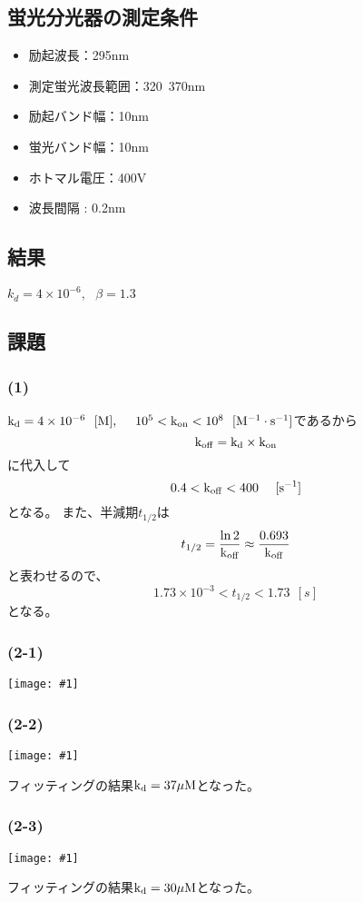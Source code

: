 \documentclass[a4paper,papersize,dvipdfmx]{jsarticle}
\newcommand{\pict}[2]{\begin{center} \texttt{[image: \#1]} \end{center}}   %
\begin{document}
\subsection*{蛍光分光器の測定条件}
\begin{itemize}
\item 励起波長：295nm
\item 測定蛍光波長範囲：320~370nm
\item 励起バンド幅：10nm
\item 蛍光バンド幅：10nm
\item ホトマル電圧：400V
\item 波長間隔 : 0.2nm

\end{itemize}
\subsection*{結果}

$k_d = 4\times 10 ^{-6}, \ \ \ \beta = 1.3$

\subsection*{課題}

\subsubsection*{(1)}
$\rm k_d = 4\times 10 ^{-6} \ \  [M], \ \ \ \ 10^5 < k_{on} < 10^8 \ \  [M^{-1} \cdot s^{-1}]$であるから
\[\rm k_{off} = k_d \times k_{on}\]
に代入して
\[\rm 0.4 < k_{off} < 400  \ \ \ \ [s^{-1}]\]
となる。
また、半減期$t_{1/2}$は
\[t_{1/2} = \frac{\ln 2}{\rm{k_{off}}} \approx \frac{0.693}{\rm{k_{off}}}\]
と表わせるので、
\[ 1.73 \times 10^{-3} < t_{1/2} < 1.73 \ \ [s]\]
となる。

\subsubsection*{(2-1)}
\pict{imgs/g1.png}{10}

\subsubsection*{(2-2)}
\pict{imgs/g2.png}{10}
フィッティングの結果$\rm k_d = 37 \mu M$となった。

\subsubsection*{(2-3)}
\pict{imgs/g3.png}{10}
フィッティングの結果$\rm k_d = 30 \mu M$となった。
\end{document}
